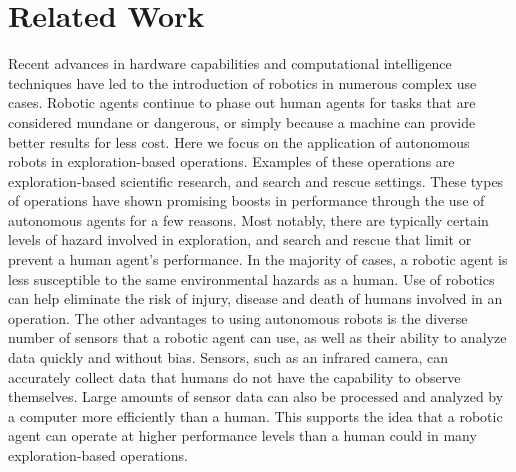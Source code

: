 


\chapter{Related Work} \label{ch:related_works}
Recent advances in hardware capabilities and computational intelligence techniques have led to the introduction of robotics in numerous complex use cases.
Robotic agents continue to phase out human agents for tasks that are considered mundane or dangerous, or simply because a machine can provide better results for less cost.
Here we focus on the application of autonomous robots in exploration-based operations.
Examples of these operations are exploration-based scientific research, and search and rescue settings. 
These types of operations have shown promising boosts in performance through the use of autonomous agents for a few reasons.
Most notably, there are typically certain levels of hazard involved in exploration, and search and rescue that limit or prevent a human agent's performance.
In the majority of cases, a robotic agent is less susceptible to the same environmental hazards as a human.
Use of robotics can help eliminate the risk of injury, disease and death of humans involved in an operation.
The other advantages to using autonomous robots is the diverse number of sensors that a robotic agent can use, as well as their ability to analyze data quickly and without bias.
Sensors, such as an infrared camera, can accurately collect data that humans do not have the capability to observe themselves.
Large amounts of sensor data can also be processed and analyzed by a computer more efficiently than a human.
This supports the idea that a robotic agent can operate at higher performance levels than a human could in many exploration-based operations.

